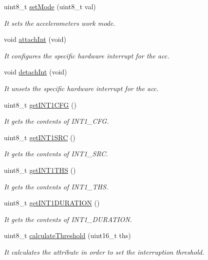 \begin{DoxyCompactItemize}
uint8\+\_\+t \hyperlink{class_wasp_a_c_c_a9e681501dd207a30d46d39cd2976fd5f}{set\+Mode} (uint8\+\_\+t val)
\begin{DoxyCompactList}\small\item\em It sets the accelerometer\textquotesingle{}s work mode. \end{DoxyCompactList}\item 
void \hyperlink{class_wasp_a_c_c_ad3e1312dc2936011eda5dee30b75b0e0}{attach\+Int} (void)
\begin{DoxyCompactList}\small\item\em It configures the specific hardware interrupt for the acc. \end{DoxyCompactList}\item 
void \hyperlink{class_wasp_a_c_c_a43613588f024b0d52cc23ec27aaa496a}{detach\+Int} (void)
\begin{DoxyCompactList}\small\item\em It unsets the specific hardware interrupt for the acc. \end{DoxyCompactList}\item 
uint8\+\_\+t \hyperlink{class_wasp_a_c_c_a4e5449e60c35245c78dbd657a52858ef}{get\+I\+N\+T1\+C\+FG} ()
\begin{DoxyCompactList}\small\item\em It gets the contents of I\+N\+T1\+\_\+\+C\+FG. \end{DoxyCompactList}\item 
uint8\+\_\+t \hyperlink{class_wasp_a_c_c_a1de35cd7feb62b5a0d33279e9758b230}{get\+I\+N\+T1\+S\+RC} ()
\begin{DoxyCompactList}\small\item\em It gets the contents of I\+N\+T1\+\_\+\+S\+RC. \end{DoxyCompactList}\item 
uint8\+\_\+t \hyperlink{class_wasp_a_c_c_ae95dc6e86625e340c3bb6361e2e67ce7}{get\+I\+N\+T1\+T\+HS} ()
\begin{DoxyCompactList}\small\item\em It gets the contents of I\+N\+T1\+\_\+\+T\+HS. \end{DoxyCompactList}\item 
uint8\+\_\+t \hyperlink{class_wasp_a_c_c_aebaccb781df39b214ae54139d7a40fd5}{get\+I\+N\+T1\+D\+U\+R\+A\+T\+I\+ON} ()
\begin{DoxyCompactList}\small\item\em It gets the contents of I\+N\+T1\+\_\+\+D\+U\+R\+A\+T\+I\+ON. \end{DoxyCompactList}\item 
uint8\+\_\+t \hyperlink{class_wasp_a_c_c_af0314c66822649636c7442de22e750bb}{calculate\+Threshold} (uint16\+\_\+t ths)
\begin{DoxyCompactList}\small\item\em It calculates the attribute in order to set the interruption threshold. \end{DoxyCompactList}\end{DoxyCompactItemize}
